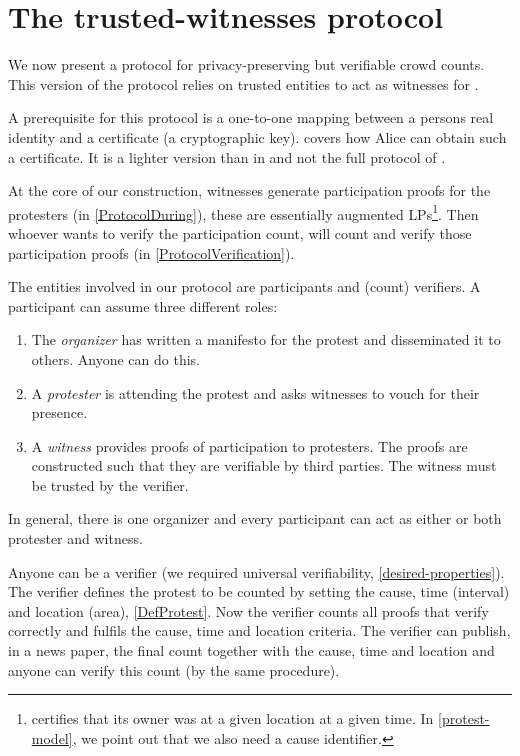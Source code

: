 \section{The trusted-witnesses protocol}%
\label{trusted-witnesses-protocol}

We now present a protocol for privacy-preserving but verifiable crowd
counts.
This version of the protocol relies on trusted entities to act as witnesses for 
.

A prerequisite for this protocol is a one-to-one mapping between a persons real 
identity and a certificate (\ie a cryptographic key).
 covers how Alice can obtain such a certificate.
It is a lighter version than in \cite{SelfCertifiedSybilFreePseudonyms} and not 
the full protocol of \cite{HowToWinTheCloneWars}.

At the core of our construction, witnesses generate participation proofs for 
the protesters (in \cref{ProtocolDuring}), these are essentially augmented 
\acp{LP}\footnote{%
   certifies that its owner was at a given location at a given time.
  In \cref{protest-model}, we point out that we also need a cause identifier.
}.
Then whoever wants to verify the participation count, will count and verify 
those participation proofs (in \cref{ProtocolVerification}). 

The entities involved in our protocol are participants and (count) verifiers.
A participant can assume three different roles:
\begin{enumerate}
\item The \emph{organizer} has written a manifesto for the protest and 
  disseminated it to others.
  Anyone can do this.
\item A \emph{protester} is attending the protest and asks witnesses to vouch 
  for their presence.
\item A \emph{witness} provides proofs of participation to protesters.
  The proofs are constructed such that they are verifiable by third parties.
  The witness must be trusted by the verifier.
\end{enumerate}
In general, there is one organizer and every participant can act as
either or both protester and witness.

Anyone can be a verifier (we required universal verifiability, 
\cref{desired-properties}).
The verifier defines the protest to be counted by setting the cause, time 
(interval) and location (area), \cf \cref{DefProtest}.
Now the verifier counts all proofs that verify correctly and fulfils the cause, 
time and location criteria.
The verifier can publish, \eg in a news paper, the final count together with 
the cause, time and location and anyone can verify this count (by the same 
procedure).

